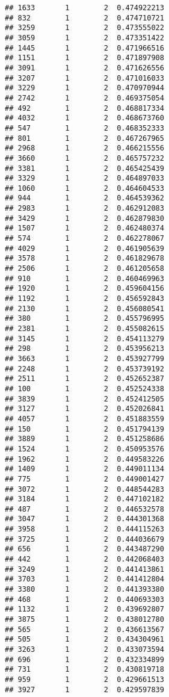 \documentclass[
]{article}
\begin{document}
\begin{verbatim}
## 1633       1        2  0.474922213
## 832        1        2  0.474710721
## 3259       1        2  0.473555022
## 3059       1        2  0.473351422
## 1445       1        2  0.471966516
## 1151       1        2  0.471897908
## 3091       1        2  0.471626556
## 3207       1        2  0.471016033
## 3229       1        2  0.470970944
## 2742       1        2  0.469375054
## 492        1        2  0.468817334
## 4032       1        2  0.468673760
## 547        1        2  0.468352333
## 801        1        2  0.467267965
## 2968       1        2  0.466215556
## 3660       1        2  0.465757232
## 3381       1        2  0.465425439
## 3329       1        2  0.464897033
## 1060       1        2  0.464604533
## 944        1        2  0.464539362
## 2983       1        2  0.462912083
## 3429       1        2  0.462879830
## 1507       1        2  0.462480374
## 574        1        2  0.462278067
## 4029       1        2  0.461905639
## 3578       1        2  0.461829678
## 2506       1        2  0.461205658
## 910        1        2  0.460469963
## 1920       1        2  0.459604156
## 1192       1        2  0.456592843
## 2130       1        2  0.456080541
## 380        1        2  0.455796995
## 2381       1        2  0.455082615
## 3145       1        2  0.454113279
## 298        1        2  0.453956213
## 3663       1        2  0.453927799
## 2248       1        2  0.453739192
## 2511       1        2  0.452652387
## 100        1        2  0.452524338
## 3839       1        2  0.452412505
## 3127       1        2  0.452026841
## 4057       1        2  0.451883559
## 150        1        2  0.451794139
## 3889       1        2  0.451258686
## 1524       1        2  0.450953576
## 1962       1        2  0.449583226
## 1409       1        2  0.449011134
## 775        1        2  0.449001427
## 3072       1        2  0.448544283
## 3184       1        2  0.447102182
## 487        1        2  0.446532578
## 3047       1        2  0.444301368
## 3958       1        2  0.444115263
## 3725       1        2  0.444036679
## 656        1        2  0.443487290
## 442        1        2  0.442068403
## 3249       1        2  0.441413861
## 3703       1        2  0.441412804
## 3380       1        2  0.441393380
## 468        1        2  0.440693303
## 1132       1        2  0.439692807
## 3875       1        2  0.438012780
## 565        1        2  0.436613567
## 505        1        2  0.434304961
## 3263       1        2  0.433073594
## 696        1        2  0.432334899
## 731        1        2  0.430819718
## 959        1        2  0.429661513
## 3927       1        2  0.429597839

\end{verbatim}
\end{document}
